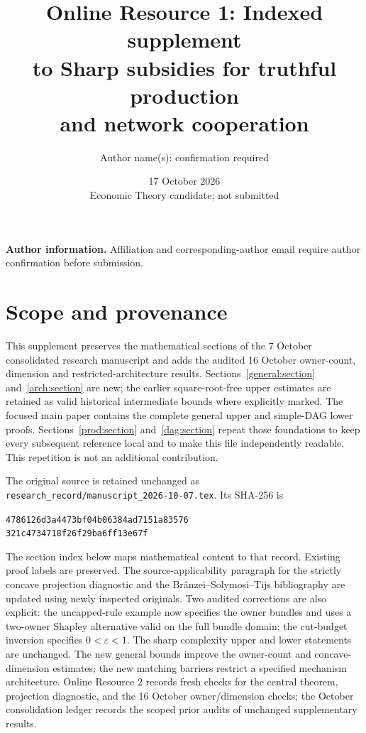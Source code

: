 \documentclass[11pt]{article}
\title{Online Resource 1: Indexed supplement\\to Sharp subsidies for truthful production\\and network cooperation}
\author{Author name(s): confirmation required}
\date{17 October 2026\\[2pt]\small Economic Theory candidate; not submitted}
\theoremstyle{definition}\newtheorem{definition}[theorem]{Definition}
\theoremstyle{remark}\newtheorem{remark}[theorem]{Remark}
\begin{document}
\maketitle
\noindent\textbf{Author information.} Affiliation and corresponding-author email
require author confirmation before submission.

\section*{Scope and provenance}
This supplement preserves the mathematical sections of the 7 October
consolidated research manuscript and adds the audited 16 October owner-count,
dimension and restricted-architecture results. Sections~\ref{general:section}
and~\ref{arch:section} are new; the earlier square-root-free upper estimates
are retained as valid historical intermediate bounds where explicitly marked. The focused main paper contains the complete
general upper and simple-DAG lower proofs. Sections~\ref{prod:section}
and~\ref{dag:section} repeat those foundations to keep every subsequent
reference local and to make this file independently readable. This repetition
is not an additional contribution.

The original source is retained unchanged as
\texttt{research\_record/manuscript\_2026-10-07.tex}. Its SHA-256 is
\begin{center}\small\texttt{4786126d3a4473bf04b06384ad7151a83576}\\
\texttt{321c4734718f26f29ba6ff13e67f}\end{center}
The section index below maps mathematical content to that record. Existing
proof labels are preserved. The source-applicability paragraph for the strictly
concave projection diagnostic and the Br\^anzei--Solymosi--Tijs bibliography
are updated using newly inspected originals. Two audited corrections are
also explicit: the uncapped-rule example now specifies the owner bundles
and uses a two-owner Shapley alternative valid on the full bundle domain;
the cut-budget inversion specifies $0<\varepsilon<1$. The sharp complexity upper and lower statements are unchanged. The new
general bounds improve the owner-count and concave-dimension estimates;
the new matching barriers restrict a specified mechanism architecture. Online Resource 2 records fresh checks for the
central theorem, projection diagnostic, and the 16 October owner/dimension
checks; the October consolidation ledger
records the scoped prior audits of unchanged supplementary results.
\end{document}
